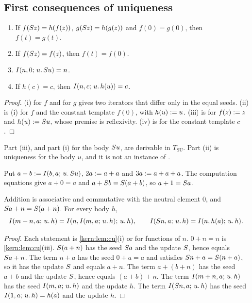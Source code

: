 \subsection{First consequences of uniqueness}
\label{kern:sec:urfirst}

\begin{lemma}
\label{kern:lem:cu}
\begin{enumerate}[label=\textup{(\roman*)}]
\item If $f(S z)=h(f(z))$, $g(S z)=h(g(z))$ and $f(0)=g(0)$, then
 $f(t)=g(t)$.
\item If $f(S z)=f(z)$, then $f(t)=f(0)$.
\item $I(n,0;\,u.\,S u)=n$.
\item If $h(c)=c$, then $I(n,c;\,u.\,h(u))=c$.
\end{enumerate}
\end{lemma}

\begin{proof}
(i)  for $f$ and for $g$ gives two iterators that differ only
in the equal seeds.  (ii) is (i) for $f$ and the constant template $f(0)$,
with $h(u)\mathrel{:=} u$.  (iii) is  for $f(z)\mathrel{:=} z$ and
$h(u)\mathrel{:=}S u$, whose premise is reflexivity.  (iv) is 
for the constant template $c$.
\end{proof}

Part (iii), and part (i) for the body $S u$, are derivable in
$T_{\mathrm{SU}}$.  Part (ii) is uniqueness for the body $u$, and it is not
an instance of .

Put $a+b\mathrel{:=}I(b,a;\,u.\,S u)$, $2a\mathrel{:=} a+a$ and $3a\mathrel{:=} a+a+a$.
The computation equations give $a+0=a$ and $a+S b=S(a+b)$, so
$a+1=S a$.

\begin{lemma}
\label{kern:lem:uradd}
Addition is associative and commutative with the neutral element $0$, and
$S a+n=S(a+n)$.  For every body $h$,
\[
 I(m+n,a;\,u.\,h)=I(n,I(m,a;\,u.\,h);\,u.\,h),\qquad
 I(S n,a;\,u.\,h)=I(n,h(a);\,u.\,h).
\]
\end{lemma}

\begin{proof}
Each statement is \cref{kern:lem:cu}(i) or  for functions of
$n$.  $0+n=n$ is \cref{kern:lem:cu}(iii).  $S(a+n)$ has the seed
$S a$ and the update $S$, hence equals $S a+n$.  The term $n+a$
has the seed $0+a=a$ and satisfies $S n+a=S(n+a)$, so it has the
update $S$ and equals $a+n$.  The term $a+(b+n)$ has the seed $a+b$ and
the update $S$, hence equals $(a+b)+n$.  The term $I(m+n,a;\,u.\,h)$
has the seed $I(m,a;\,u.\,h)$ and the update $h$.  The term
$I(S n,a;\,u.\,h)$ has the seed $I(1,a;\,u.\,h)=h(a)$ and the update
$h$.
\end{proof}

